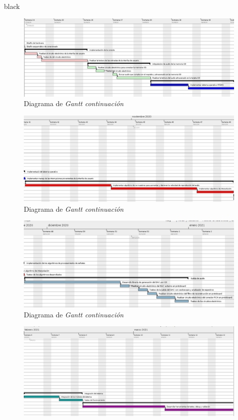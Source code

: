 \documentclass[11pt]{charter}
\begin{document}
\begin{consigna}{black}
\begin{figure}[H]
\centering 
\includegraphics[width=1.5\textwidth,angle=-90]{./Figuras/gant4.png}
\caption{Diagrama de \textit{Gantt continuación}}
\label{fig:gant1}
\end{figure}

\begin{figure}[H]
\centering 
\includegraphics[width=1.5\textwidth,angle=-90]{./Figuras/gant5.png}
\caption{Diagrama de \textit{Gantt continuación}}
\label{fig:gant1}
\end{figure}
\begin{figure}[H]
\centering 
\includegraphics[width=1.5\textwidth,angle=-90]{./Figuras/gant6.png}
\caption{Diagrama de \textit{Gantt continuación}}
\label{fig:gant1}
\end{figure}
\begin{figure}[H]
\centering 
\includegraphics[width=1.5\textwidth,angle=-90]{./Figuras/gant7.png}

\end{figure}
\end{consigna}
\end{document}

